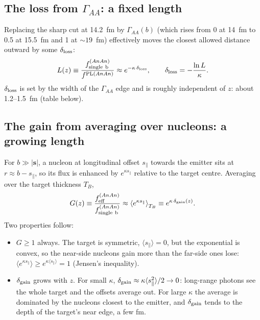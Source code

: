 \documentclass[11pt]{article}
\begin{document}
\subsection{The loss from $\Gamma_{AA}$: a fixed length}

Replacing the sharp cut at 14.2~fm by $\Gamma_{AA}(b)$ (which rises from 0
at 14~fm to 0.5 at 15.5~fm and 1 at $\sim19$~fm) effectively moves the
closest allowed distance outward by some $\delta_{\rm loss}$:
\begin{equation}
  L(z) \equiv \frac{f^{(AnAn)}_{\rm single\ b}}{f^{{\rm PL}(AnAn)}}
  \approx e^{-\kappa\,\delta_{\rm loss}}, \qquad
  \delta_{\rm loss} = -\frac{\ln L}{\kappa}.
\end{equation}
$\delta_{\rm loss}$ is set by the width of the $\Gamma_{AA}$ edge and is
roughly independent of $z$: about 1.2--1.5~fm (table below).

\subsection{The gain from averaging over nucleons: a growing length}

For $b\gg|\mathbf s|$, a nucleon at longitudinal offset $s_\parallel$
towards the emitter sits at $r\approx b-s_\parallel$, so its flux is
enhanced by $e^{\kappa s_\parallel}$ relative to the target centre.
Averaging over the target thickness $T_B$,
\begin{equation}
  G(z) \equiv \frac{f^{(AnAn)}_{\rm eff}}{f^{(AnAn)}_{\rm single\ b}}
  \approx \left\langle e^{\kappa s_\parallel} \right\rangle_{T_B}
  \equiv e^{\kappa\,\delta_{\rm gain}(z)} .
\end{equation}
Two properties follow:
\begin{itemize}
  \item $G\ge1$ always. The target is symmetric, $\langle s_\parallel\rangle=0$,
    but the exponential is convex, so the near-side nucleons gain more than
    the far-side ones lose: $\langle e^{\kappa s_\parallel}\rangle \ge
    e^{\kappa\langle s_\parallel\rangle}=1$ (Jensen's inequality).
  \item $\delta_{\rm gain}$ grows with $z$. For small $\kappa$,
    $\delta_{\rm gain}\approx\kappa\langle s_\parallel^2\rangle/2\to0$:
    long-range photons see the whole target and the offsets average out.
    For large $\kappa$ the average is dominated by the nucleons closest to
    the emitter, and $\delta_{\rm gain}$ tends to the depth of the target's
    near edge, a few fm.
\end{itemize}
\end{document}
